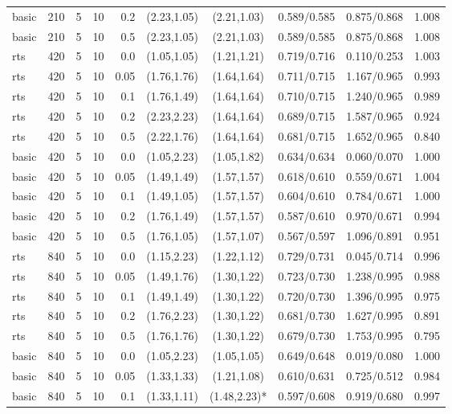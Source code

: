 \begin{tabular}{llrrrccccc}
basic & 210 & 5 & 10 & 0.2 & (2.23,1.05) & (2.21,1.03) & 0.589/0.585 & 0.875/0.868 & 1.008 \\
basic & 210 & 5 & 10 & 0.5 & (2.23,1.05) & (2.21,1.03) & 0.589/0.585 & 0.875/0.868 & 1.008 \\
rts & 420 & 5 & 10 & 0.0 & (1.05,1.05) & (1.21,1.21) & 0.719/0.716 & 0.110/0.253 & 1.003 \\
rts & 420 & 5 & 10 & 0.05 & (1.76,1.76) & (1.64,1.64) & 0.711/0.715 & 1.167/0.965 & 0.993 \\
rts & 420 & 5 & 10 & 0.1 & (1.76,1.49) & (1.64,1.64) & 0.710/0.715 & 1.240/0.965 & 0.989 \\
rts & 420 & 5 & 10 & 0.2 & (2.23,2.23) & (1.64,1.64) & 0.689/0.715 & 1.587/0.965 & 0.924 \\
rts & 420 & 5 & 10 & 0.5 & (2.22,1.76) & (1.64,1.64) & 0.681/0.715 & 1.652/0.965 & 0.840 \\
basic & 420 & 5 & 10 & 0.0 & (1.05,2.23) & (1.05,1.82) & 0.634/0.634 & 0.060/0.070 & 1.000 \\
basic & 420 & 5 & 10 & 0.05 & (1.49,1.49) & (1.57,1.57) & 0.618/0.610 & 0.559/0.671 & 1.004 \\
basic & 420 & 5 & 10 & 0.1 & (1.49,1.05) & (1.57,1.57) & 0.604/0.610 & 0.784/0.671 & 1.000 \\
basic & 420 & 5 & 10 & 0.2 & (1.76,1.49) & (1.57,1.57) & 0.587/0.610 & 0.970/0.671 & 0.994 \\
basic & 420 & 5 & 10 & 0.5 & (1.76,1.05) & (1.57,1.07) & 0.567/0.597 & 1.096/0.891 & 0.951 \\
rts & 840 & 5 & 10 & 0.0 & (1.15,2.23) & (1.22,1.12) & 0.729/0.731 & 0.045/0.714 & 0.996 \\
rts & 840 & 5 & 10 & 0.05 & (1.49,1.76) & (1.30,1.22) & 0.723/0.730 & 1.238/0.995 & 0.988 \\
rts & 840 & 5 & 10 & 0.1 & (1.49,1.49) & (1.30,1.22) & 0.720/0.730 & 1.396/0.995 & 0.975 \\
rts & 840 & 5 & 10 & 0.2 & (1.76,2.23) & (1.30,1.22) & 0.681/0.730 & 1.627/0.995 & 0.891 \\
rts & 840 & 5 & 10 & 0.5 & (1.76,1.76) & (1.30,1.22) & 0.679/0.730 & 1.753/0.995 & 0.795 \\
basic & 840 & 5 & 10 & 0.0 & (1.05,2.23) & (1.05,1.05) & 0.649/0.648 & 0.019/0.080 & 1.000 \\
basic & 840 & 5 & 10 & 0.05 & (1.33,1.33) & (1.21,1.08) & 0.610/0.631 & 0.725/0.512 & 0.984 \\
basic & 840 & 5 & 10 & 0.1 & (1.33,1.11) & (1.48,2.23)* & 0.597/0.608 & 0.919/0.680 & 0.997 \\

\end{tabular}
